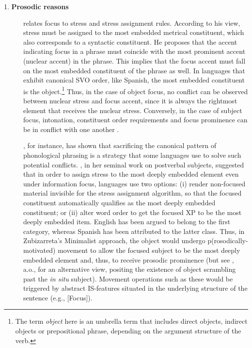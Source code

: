 \begin{description}
    \item[1. \textbf{Prosodic reasons}]
    
\textcite{cinque1993null} relates focus to stress and stress assignment rules.  According to his view, stress must be assigned to the most embedded metrical constituent, which also corresponds to a syntactic constituent. He proposes that the accent indicating focus in a phrase must coincide with the most prominent accent (nuclear accent) in the phrase. This implies that the focus accent must fall on the most embedded constituent of the phrase as well. In languages that exhibit canonical SVO order, like Spanish, the most embedded constituent is the object.\footnote {The term \textit{object} here is an umbrella term that includes direct objects, indirect objects or prepositional phrase, depending on the argument structure of the verb.} Thus, in the case of object focus, no conflict can be observed between nuclear stress and focus accent, since it is always the rightmost element that receives the nuclear stress. Conversely, in the case of subject focus, intonation, constituent order requirements and focus prominence can be in conflict with one another \parencite{selkirk1995sentence, truckenbrodt1999relation}.

\textcite{truckenbrodt1999relation}, for instance, has shown that sacrificing the canonical pattern of phonological phrasing is a strategy that some languages use to solve such potential conflicts.
\textcite{zubizarreta1998prosody}, in her seminal work on postverbal subjects, suggested that in order to assign stress to the most deeply embedded element even under information focus, languages use two options: (i) render non-focused material invisible for the stress assignment algorithm, so that the focused constituent automatically qualifies as the most deeply embedded constituent; or (ii) alter word order to get the focused XP to be the most deeply embedded item. English has been argued to belong to the first category, whereas Spanish has been attributed to the latter class. Thus, in Zubizarreta's Minimalist approach, the  object  would  undergo p(rosodically-motivated) movement to allow the focused subject to be the most deeply embedded element and, thus, to receive prosodic prominence (but see \cite{ordonez2000clausal}, a.o., for an alternative view, positing the existence of object scrambling past the \textit{in situ} subject). Movement operations such as these would be triggered by abstract IS-features situated in the underlying structure of the sentence (e.g., [Focus]).


\end{description}
